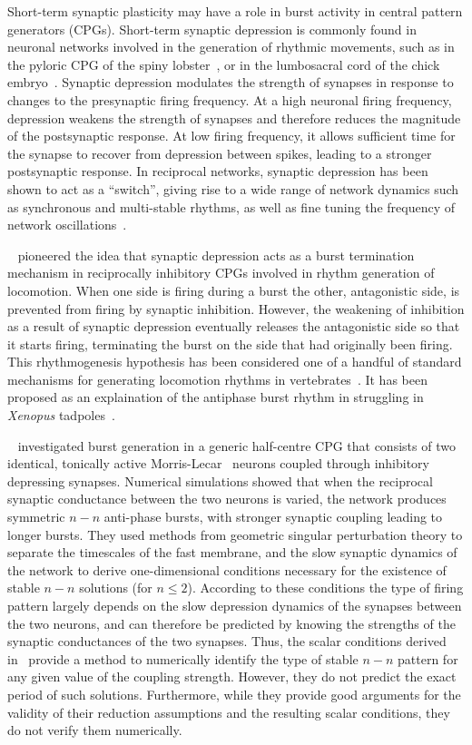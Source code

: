 \documentclass[../manuscript.tex]{subfiles}
\begin{document}
Short-term synaptic plasticity may have a role in burst activity in central pattern
generators (CPGs).  Short-term synaptic depression is commonly found in neuronal networks
involved in the generation of rhythmic movements, such as in the pyloric CPG of the spiny
lobster~\citep{manor1997, rabbah2007}, or in the lumbosacral cord of the chick
embryo~\citep{donovan1998}.  Synaptic depression modulates the strength of synapses in
response to changes to the presynaptic firing frequency.  At a high neuronal firing
frequency, depression weakens the strength of synapses and therefore reduces the magnitude
of the postsynaptic response.  At low firing frequency, it allows sufficient time for the
synapse to recover from depression between spikes, leading to a stronger postsynaptic
response.  In reciprocal networks, synaptic depression has been shown to act as a
``switch'', giving rise to a wide range of network dynamics such as synchronous and
multi-stable rhythms, as well as fine tuning the frequency of network
oscillations~\citep{nadim2000, nadim1999, bose2011}.

~\citet{brown1911} pioneered the idea that synaptic depression acts as a burst termination
mechanism in reciprocally inhibitory CPGs involved in rhythm generation of locomotion.
When one side is firing during a burst the other, antagonistic side, is prevented from
firing by synaptic inhibition. However, the weakening of inhibition as a result of
synaptic depression eventually releases the antagonistic side so that it starts firing,
terminating the burst on the side that had originally been firing.  This rhythmogenesis
hypothesis has been considered one of a handful of standard mechanisms for generating
locomotion rhythms in vertebrates~\citep{reiss1962,perkel1974,friesen1994}. It has been
proposed as an explaination of the antiphase burst rhythm in struggling in
\textit{Xenopus} tadpoles~\citep{li2007}.

~\citet{bose2011} investigated burst generation in a generic half-centre CPG that consists
of two identical, tonically active Morris-Lecar~\citep{morris1981} neurons coupled through
inhibitory depressing synapses.  Numerical simulations showed that when the reciprocal
synaptic conductance between the two neurons is varied, the network produces symmetric
$n-n$ anti-phase bursts, with stronger synaptic coupling leading to longer bursts.  They
used methods from geometric singular perturbation theory to separate the timescales of the
fast membrane, and the slow synaptic dynamics of the network to derive one-dimensional
conditions necessary for the existence of stable $n-n$ solutions (for $n\leq 2$).
According to these conditions the type of firing pattern largely depends on the slow
depression dynamics of the synapses between the two neurons, and can therefore be
predicted by knowing the strengths of the synaptic conductances of the two synapses.
Thus, the scalar conditions derived in~\citet{bose2011} provide a method to numerically
identify the type of stable $n-n$ pattern for any given value of the coupling strength.
However, they do not predict the exact period of such solutions.  Furthermore, while they
provide good arguments for the validity of their reduction assumptions and the resulting
scalar conditions, they do not verify them numerically.
\end{document}
